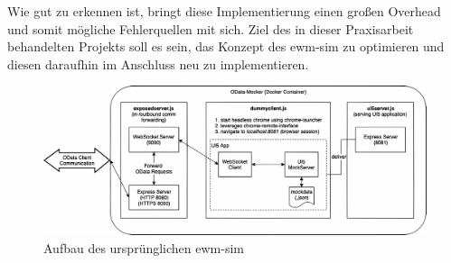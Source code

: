 Wie gut zu erkennen ist, bringt diese Implementierung einen großen Overhead und somit mögliche Fehlerquellen mit sich. Ziel des in dieser Praxisarbeit behandelten Projekts soll es sein, das Konzept des \ac{ewm-sim} zu optimieren und diesen daraufhin im Anschluss neu zu implementieren.

\begin{figure}
    \centering
    \includegraphics[width=\textwidth]{Bilder/ewm-sim_v1_4x.pdf}
    \caption{Aufbau des ursprünglichen \ac{ewm-sim}}
    \label{fig:ewm-sim-v1}
\end{figure}

